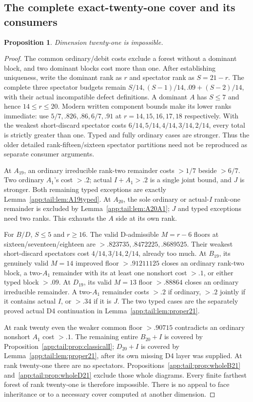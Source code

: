 \documentclass[11pt]{article}
\newtheorem{proposition}[theorem]{Proposition}
\theoremstyle{definition}
\theoremstyle{remark}
\begin{document}
\subsection{The complete exact-twenty-one cover and its consumers}
\label{app:tail:exact21}
\begin{proposition}
\label{app:tail:prop:exact21}
Dimension twenty-one is impossible.
\end{proposition}
\begin{proof}
The common ordinary/debit costs exclude a forest without a dominant
block, and two dominant blocks cost more than one. After establishing
uniqueness, write the dominant rank as $r$ and spectator rank as
$S=21-r$. The complete three spectator budgets remain
$S/14,(S-1)/14,.09+(S-2)/14$, with their actual incompatible
defect definitions. A dominant $A$ has $S\le7$ and hence
$14\le r\le20$. Modern written component bounds make its lower
ranks immediate: use $5/7,.826,.86,6/7,.91$ at
$r=14,15,16,17,18$ respectively. With the weakest short-discard
spectator costs $6/14,5/14,4/14,3/14,2/14$, every total is
strictly greater than one. Typed and fully ordinary cases are
stronger. Thus the older detailed rank-fifteen/sixteen spectator
partitions need not be reproduced as separate consumer arguments.

At $A_{19}$, an ordinary irreducible rank-two remainder costs
$>1/7$ beside $>6/7$. Two ordinary $A_1$'s cost $>.2$;
actual $I+A_1>.2$ is a single joint bound, and $J$ is stronger.
Both remaining typed exceptions are exactly
Lemma~\ref{app:tail:lem:A19typed}. At $A_{20}$, the sole
ordinary or actual-$I$ rank-one remainder is excluded by
Lemma~\ref{app:tail:lem:A20A1}; $J$ and typed exceptions need
two ranks. This exhausts the $A$ side at its own rank.

For $B/D$, $S\le5$ and $r\ge16$. The valid D-admissible
$M=r-6$ floors at sixteen/seventeen/eighteen are
$>.823735,.8472225,.8689525$. Their weakest short-discard
spectators cost $4/14,3/14,2/14$, already too much.
At $B_{19}$, its genuinely valid $M=14$ improved floor
$>.91211125$ closes an ordinary rank-two block, a two-$A_1$
remainder with its at least one nonshort cost $>.1$, or either
typed block $>.09$. At $D_{19}$, its valid $M=13$ floor
$>.88864$ closes an ordinary irreducible remainder. A two-$A_1$
remainder costs $>.2$ if ordinary, $>.2$ jointly if it contains
actual $I$, or $>.34$ if it is $J$. The two typed cases are
the separately proved actual D4 continuation in
Lemma~\ref{app:tail:lem:proper21}.

At rank twenty even the weaker common floor $>.90715$ contradicts
an ordinary nonshort $A_1$ cost $>.1$. The remaining entire
$B_{20}+I$ is covered by Proposition~\ref{app:tail:prop:classicalI};
$D_{20}+I$ is covered by Lemma~\ref{app:tail:lem:proper21},
after its own missing D4 layer was supplied. At rank twenty-one
there are no spectators. Propositions~\ref{app:tail:prop:wholeB21}
and~\ref{app:tail:prop:wholeD21} exclude those whole diagrams.
Every finite farthest forest of rank twenty-one is therefore
impossible. There is no appeal to face inheritance or to a
necessary cover computed at another dimension.
\end{proof}
\end{document}
